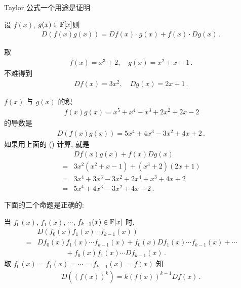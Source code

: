 Taylor 公式一个用途是证明

\begin{proposition}
    设 $f(x)$, $g(x) \in \mathbb{F}[x]$\period 则
    \begin{align*}
        D(f(x) g(x)) = Df(x) \cdot g(x) + f(x) \cdot Dg(x) \period \tag*{(\myStar)}
    \end{align*}
\end{proposition}

\begin{pf}
\end{pf}

\begin{example}
    取
    \begin{align*}
        f(x) = x^3 + 2, \quad g(x) = x^2 + x - 1 \period
    \end{align*}
    不难得到
    \begin{align*}
        Df (x) = 3x^2, \quad Dg (x) = 2x + 1 \period
    \end{align*}

    $f(x)$ 与 $g(x)$ 的积
    \begin{align*}
        f(x) g(x) = x^5 + x^4 - x^3 + 2x^2 + 2x - 2
    \end{align*}
    的导数是
    \begin{align*}
        D(f(x) g(x)) = 5x^4 + 4x^3 - 3x^2 + 4x + 2 \period
    \end{align*}
    如果用上面的 (\myStar) 计算, 就是
    \begin{align*}
             & Df (x) g(x) + f(x) Dg (x)                \\
        = {} & 3x^2 (x^2 + x - 1) + (x^3 + 2) (2x + 1)  \\
        = {} & 3x^4 + 3x^3 - 3x^2 + 2x^4 + x^3 + 4x + 2 \\
        = {} & 5x^4 + 4x^3 - 3x^2 + 4x + 2 \period
    \end{align*}
\end{example}

下面的二个命题是正确的:

\begin{proposition}
    当 $f_0 (x)$, $f_1 (x)$, $\cdots$, $f_{k-1} (x) \in \mathbb{F}[x]$ 时,
    \begin{align*}
             & D(f_0 (x) f_1 (x) \cdots f_{k-1} (x))                                              \\
        = {} & Df_0 (x) f_1 (x) \cdots f_{k-1} (x) + f_0 (x) Df_1 (x) \cdots f_{k-1} (x) + \cdots \\
             & \qquad \qquad + f_0 (x) f_1 (x) \cdots Df_{k-1} (x) \period
    \end{align*}
    取 $f_0 (x) = f_1 (x) = \cdots = f_{k-1} (x) = f(x)$ 知
    \begin{align*}
        D((f(x))^k) = k(f(x))^{k-1} Df(x) \period
    \end{align*}
\end{proposition}


